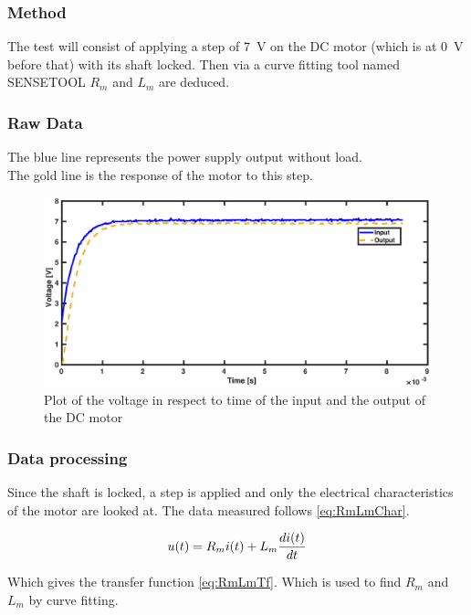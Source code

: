 \subsubsection*{Method}
The test will consist of applying a step of \SI{7}{\volt} on the DC motor (which is at \SI{0}{\volt} before that) with its shaft locked. Then via a curve fitting tool named SENSETOOL $R_m$ and $L_m$ are deduced.

\subsubsection*{Raw Data}
The blue line represents the power supply output without load.\\
The gold line is the response of the motor to this step.
\begin{figure}[htbp]
	\centering
	\includegraphics[width=\textwidth]{figures/appendix/Motor&GearTests/RmLmDataPlot}
	\caption{Plot of the voltage in respect to time of the input and the output of the DC motor}\label{fig:RmLmTestDataPlot}
\end{figure}

\subsubsection*{Data processing}

Since the shaft is locked, a step is applied and only the electrical characteristics of the motor are looked at. The data measured follows \autoref{eq:RmLmChar}.

\begin{equation} \label{eq:RmLmChar}
	u(t)=R_m i(t)+L_m \frac{d i(t)}{d t} \addunit{\volt}
\end{equation}

Which gives the transfer function \autoref{eq:RmLmTf}. Which is used to find $R_m$ and $L_m$ by curve fitting.

